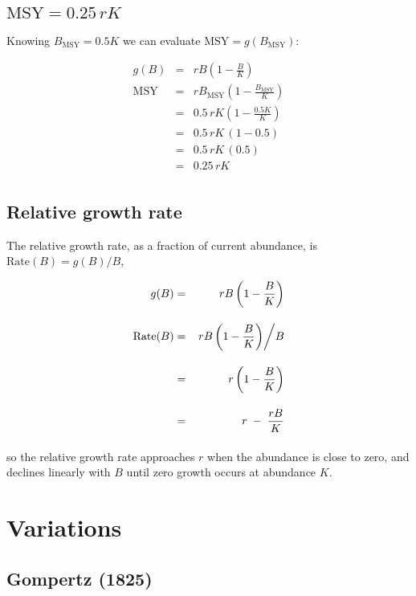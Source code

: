 \documentclass[fleqn]{article}
\newcommand{\MSY}{\mathrm{MSY}}
\newcommand{\msy}{_\mathrm{MSY}}
\newcommand{\Rate}{\mathrm{Rate}}
\begin{document}
\newpage

\subsection{$\MSY=0.25\,rK$}

Knowing $B\msy\!=\!0.5K$ we can evaluate $\MSY\!=\!g(B\msy)$:

\begin{eqnarray*}
  g(B) &=& rB\left(1-\frac{B}{K}\right)          \\[1em]
  \MSY &=& rB\msy\!\left(1-\frac{B\msy}{K}\right)\\[1em]
  ~    &=& 0.5\,rK\!\left(1-\frac{0.5K}{K}\right)\\[1em]
  ~    &=& 0.5\,rK\,(1\!-\!0.5)                  \\[1em]
  ~    &=& 0.5\,rK\,(0.5)                        \\[1em]
  ~    &=& 0.25\,rK                              \\[1ex]
\end{eqnarray*}

\subsection{Relative growth rate}

The relative growth rate, as a fraction of current abundance, is
$\Rate(B)=g(B)/B$,

\begin{eqnarray*}
  g(B)     &=& rB\left(1-\frac{B}{K}\right)                \\[1em]
  \Rate(B) &=& \left.rB\left(1-\frac{B}{K}\right)\right/\!B\\[1em]
  ~        &=& r\left(1-\frac{B}{K}\right)                 \\[1em]
  ~        &=& r \;-\; \frac{rB}{K}                        \\[1ex]
\end{eqnarray*}

so the relative growth rate approaches $r$ when the abundance is close to zero,
and declines linearly with $B$ until zero growth occurs at abundance $K$.

\newpage

\section{Variations}

\subsection{Gompertz (1825)}
\end{document}
